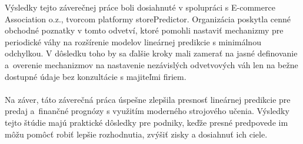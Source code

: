     Výsledky tejto záverečnej práce boli dosiahnuté v spolupráci s E-commerce
    Association o.z., tvorcom platformy storePredictor. Organizácia poskytla cenné obchodné
    poznatky v tomto odvetví, ktoré pomohli nastaviť mechanizmy
    pre periodické váhy na rozšírenie modelov lineárnej predikcie s minimálnou odchylkou.
    V dôsledku toho by sa ďalšie kroky mali zamerať na jasné definovanie a~overenie
    mechanizmov na nastavenie nezávislých odvetvových váh len na bežne dostupné údaje
    bez konzultácie s majiteľmi firiem.\\
    \\
    Na záver, táto záverečná práca úspešne zlepšila presnosť lineárnej predikcie pre predaj a~finančné
    prognózy s využitím moderného strojového učenia. Výsledky tejto štúdie majú praktické
    dôsledky pre podniky, keďže presné predpovede im môžu pomôcť robiť lepšie rozhodnutia,
    zvýšiť zisky a dosiahnuť ich ciele.

